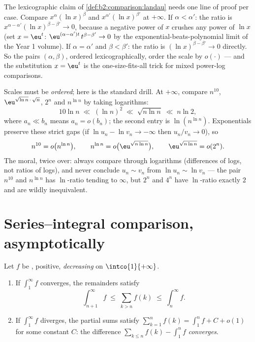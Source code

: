 \begin{example}\label{ex:b2:comparison:scaleorder}
The lexicographic claim of \cref{def:b2:comparison:landau}
needs one line of proof per case. Compare
$x^{\alpha}(\ln x)^{\beta}$ and $x^{\alpha'}(\ln x)^{\beta'}$
at $+\infty$. If $\alpha < \alpha'$: the ratio is
$x^{\alpha - \alpha'}(\ln x)^{\beta - \beta'} \to 0$, because a
negative power of $x$ crushes any power of $\ln x$ (set $x =
\eu^t$: $\eu^{(\alpha - \alpha')t}\,t^{\beta - \beta'} \to 0$
by the exponential-beats-polynomial limit of the Year 1
volume). If $\alpha = \alpha'$ and $\beta < \beta'$: the ratio
is $(\ln x)^{\beta - \beta'} \to 0$ directly. So the pairs
$(\alpha, \beta)$, ordered lexicographically, order the scale
by $o(\cdot)$ --- and the substitution $x = \eu^t$ is the
one-size-fits-all trick for mixed power-log comparisons.
\end{example}

\begin{example}\label{ex:b2:comparison:ranking}
Scales must be \emph{ordered}; here is the standard drill. At
$+\infty$, compare $n^{10}$, $\eu^{\sqrt{\ln n}\,\cdot\,\sqrt n}$,
$2^n$ and $n^{\ln n}$ by taking logarithms:
\[
10\ln n
\;\ll\; (\ln n)^2
\;\ll\; \sqrt{n\ln n}
\;\ll\; n\ln 2 ,
\]
where $a_n \ll b_n$ means $a_n = o(b_n)$; the second entry is
$\ln(n^{\ln n})$. Exponentials preserve these strict gaps (if
$\ln u_n - \ln v_n \to -\infty$ then $u_n/v_n \to 0$), so
\[
n^{10} = o\bigl(n^{\ln n}\bigr),
\qquad
n^{\ln n} = o\bigl(\eu^{\sqrt{n\ln n}}\bigr),
\qquad
\eu^{\sqrt{n\ln n}} = o(2^n) .
\]
The moral, twice over: always compare through logarithms
(differences of logs, not ratios of logs), and never conclude
$u_n \sim v_n$ from $\ln u_n \sim \ln v_n$ --- the pair $n^{10}$
and $n^{\ln n}$ has $\ln$-ratio tending to $\infty$, but $2^n$
and $4^n$ have $\ln$-ratio exactly $2$ and are wildly
inequivalent.
\end{example}

\section{Series--integral comparison, asymptotically}

\begin{theorem}\label{thm:b2:comparison:seriesintegral}
Let $f$ be , positive, \emph{decreasing} on
$\intco{1}{+\infty}$.
\begin{enumerate}
  \item If $\int_1^{\infty} f$ converges, the remainders satisfy
        \[
        \int_{n+1}^{\infty} f \;\leq\; \sum_{k > n} f(k) \;\leq\;
        \int_{n}^{\infty} f .
        \]
  \item If $\int_1^\infty f$ diverges, the partial sums satisfy
        $\sum_{k=1}^{n} f(k) = \int_1^n f + C + o(1)$ for some
        constant $C$: the difference $\sum_{k \leq n} f(k) -
        \int_1^n f$ \emph{converges}.
\end{enumerate}
\end{theorem}

